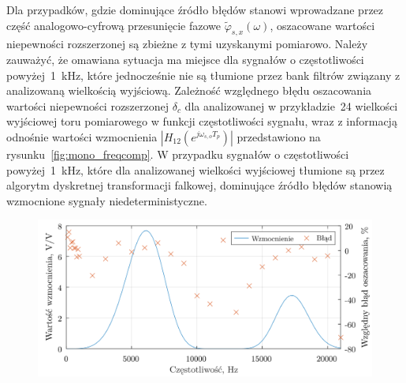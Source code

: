 Dla przypadków, gdzie dominujące źródło błędów stanowi wprowadzane przez część analogowo-cyfrową przesunięcie fazowe $\tilde{\varphi}_{s,x}(\omega)$, oszacowane wartości niepewności rozszerzonej są zbieżne z tymi uzyskanymi pomiarowo. Należy zauważyć, że omawiana sytuacja ma miejsce dla sygnałów o częstotliwości powyżej~\qty{1}{kHz}, które jednocześnie nie są tłumione przez bank filtrów związany z analizowaną wielkością wyjściową. Zależność względnego błędu oszacowania wartości niepewności rozszerzonej $\delta_{c}$ dla analizowanej w przykładzie~\qty{24}{\numTej} wielkości wyjściowej toru pomiarowego w funkcji częstotliwości sygnału, wraz z informacją odnośnie wartości wzmocnienia $|H_{12}(e^{j \omega_{s,o} T_{p}})|$ przedstawiono na rysunku~\ref{fig:mono_freqcomp}. W przypadku sygnałów o częstotliwości powyżej~\qty{1}{kHz}, które dla analizowanej wielkości wyjściowej tłumione są przez algorytm dyskretnej transformacji falkowej, dominujące źródło błędów stanowią wzmocnione sygnały niedeterministyczne.

\begin{figure}[htb!]
\begin{center}
\includegraphics{obrazki/mono_freqcomp}
\end{center}
\end{figure}

